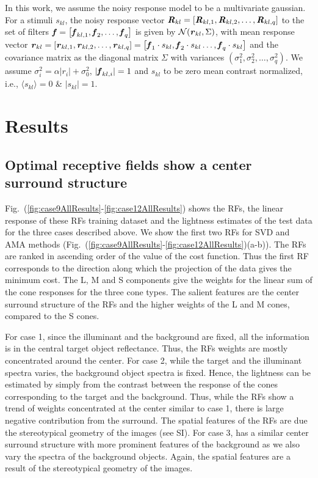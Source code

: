 \documentclass{jov}
\begin{document}
In this work, we assume the noisy response model to be a multivariate gaussian. For a stimuli $s_{kl}$, the noisy response vector ${\textbf{\textit R}}_{kl} = \left[{\textbf{\textit R}}_{kl,1},{\textbf{\textit R}}_{kl,2},\dots,{\textbf{\textit R}}_{kl,q}\right]$ to the set of filters ${\textbf{\textit f}} = \left[{\textbf{\textit f}}_{kl,1},{\textbf{\textit f}}_{2},\dots,{\textbf{\textit f}}_{q}\right]$ is given by $\mathcal{N}({\textbf{\textit r}}_{kl}, \Sigma)$, with mean response vector ${\textbf{\textit r}}_{kl} = \left[{\textbf{\textit r}}_{kl,1},{\textbf{\textit r}}_{kl,2},\dots,{\textbf{\textit r}}_{kl,q}\right] = \left[{\textbf{\textit f}}_{1}\cdot s_{kl},{\textbf{\textit f}}_{2}\cdot s_{kl}\dots,{\textbf{\textit f}}_{q}\cdot s_{kl}\right]$ and the covariance matrix as the diagonal matrix $\Sigma$ with variances $\left(\sigma_1^2, \sigma_2^2,\dots, \sigma_q^2 \right)$. We assume $\sigma_i^2 = \alpha |r_i| + \sigma_0^2$, $|{\textbf{\textit f}}_{kl,i}|=1$ and $s_{kl}$ to be zero mean contrast normalized, i.e., $\langle{s_{kl}}\rangle = 0$ \& ${|s_{kl}|=1}$.

\section{Results}
\subsection{Optimal receptive fields show a center surround structure}
Fig.~(\ref{fig:case9AllResults}-\ref{fig:case12AllResults}) shows the RFs, the linear response of these RFs training dataset and the lightness estimates of the test data for the three cases described above. We show the first two RFs for SVD and AMA methods (Fig.~(\ref{fig:case9AllResults}-\ref{fig:case12AllResults})(a-b)). The RFs are ranked in ascending order of the value of the cost function. Thus the first RF corresponds to the direction along which the projection of the data gives the minimum cost. The L, M and S components give the weights for the linear sum of the cone responses for the three cone types. The salient features are the center surround structure of the RFs and the higher weights of the L and M cones, compared to the S cones. 

For case 1, since the illuminant and the background are fixed, all the information is in the central target object reflectance. Thus, the RFs weights are mostly concentrated around the center. For case 2, while the target and the illuminant spectra varies, the background object spectra is fixed. Hence, the lightness can be estimated by simply from the contrast between the response of the cones corresponding to the target and the background. Thus, while the RFs show a trend of weights concentrated at the center similar to case 1, there is large negative contribution from the surround. The spatial features of the RFs are due the stereotypical geometry of the images (see SI). For case 3, has a similar center surround structure with more prominent features of the background as we also vary the spectra of the background objects. Again, the spatial features are a result of the stereotypical geometry of the images.
\end{document}
